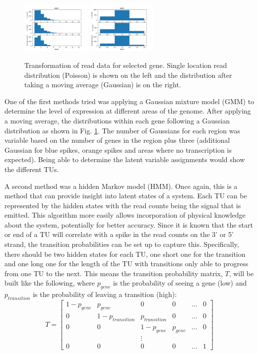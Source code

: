 \documentclass[11pt]{article}
\begin{document}
\begin{figure}[H]
    \centering
    \includegraphics[width=0.3\textwidth]{pepA.png}
    \includegraphics[width=0.3\textwidth]{pepA_ma.png}
    \caption{Transformation of read data for selected gene.  Single location read distribution (Poisson) is shown on the left and the distribution after taking a moving average (Gaussian) is on the right.}
    \label{fig:distribution}
\end{figure}

One of the first methods tried was applying a Gaussian mixture model (GMM) to determine the level of expression at different areas of the genome.  After applying a moving average, the distributions within each gene following a Gaussian distribution as shown in Fig. \ref{fig:distribution}.  The number of Gaussians for each region was variable based on the number of genes in the region plus three (additional Gaussian for blue spikes, orange spikes and areas where no transcription is expected).  Being able to determine the latent variable assignments would show the different TUs. \vspace{8pt}

A second method was a hidden Markov model (HMM).  Once again, this is a method that can provide insight into latent states of a system.  Each TU can be represented by the hidden states with the read counts being the signal that is emitted.  This algorithm more easily allows incorporation of physical knowledge about the system, potentially for better accuracy.  Since it is known that the start or end of a TU will correlate with a spike in the read counts on the 3' or 5' strand, the transition probabilities can be set up to capture this.  Specifically, there should be two hidden states for each TU, one short one for the transition and one long one for the length of the TU with transitions only able to progress from one TU to the next.  This means the transition probability matrix, $T$, will be built like the following, where $p_{gene}$ is the probability of seeing a gene (low) and $p_{transition}$ is the probability of leaving a transition (high):
\[T = \begin{bmatrix}
1-p_{gene} & p_{gene} & 0 & 0 & \dots & 0 \\
0 & 1-p_{transition} & p_{transition} & 0 & \dots & 0 \\
0 & 0 & 1-p_{gene} & p_{gene} & \dots & 0 \\
&& \vdots \\
0 & 0 & 0 & 0 & \dots & 1
\end{bmatrix}\]
\end{document}
